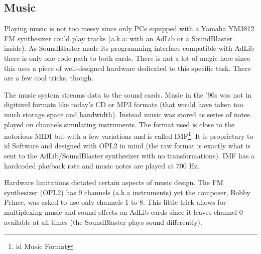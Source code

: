 \subsection{Music}
Playing music is not too messy since only PCs equipped with a Yamaha YM3812 FM synthesizer could play tracks (a.k.a: with an AdLib or a SoundBlaster inside). As SoundBlaster made its programming interface compatible with AdLib there is only one code path to both cards. There is not a lot of magic here since this uses a piece of well-designed hardware dedicated to this specific task. There are a few cool tricks, though.\\
\par
The music system streams data to the sound cards. Music in the '90s was not in digitized formats like today's CD or MP3 formats (that would have taken too much storage space and bandwidth). Instead music was stored as series of notes played on channels simulating instruments. The format used is close to the notorious MIDI but with a few variations and is called IMF\footnote{id Music Format}. It is proprietary to id Software and designed with OPL2 in mind (the raw format is exactly what is sent to the AdLib/SoundBlaster synthesizer with no transformations). IMF has a hardcoded playback rate and music notes are played at 700 Hz.\\
\par
Hardware limitations dictated certain aspects of music design. The FM synthesizer (OPL2) has 9 channels (a.k.a instruments) yet the composer, Bobby Prince, was asked to use only channels 1 to 8. This little trick allows for multiplexing music and sound effects on AdLib cards since it leaves channel 0 available at all times (the SoundBlaster plays sound differently).\\




